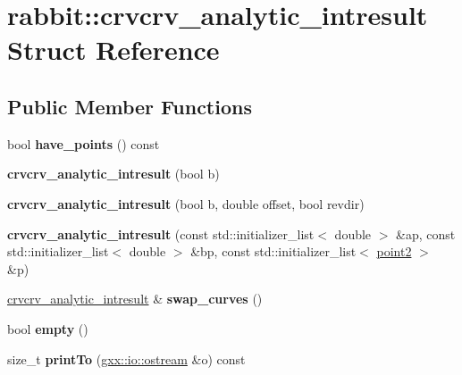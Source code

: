 \hypertarget{structrabbit_1_1crvcrv__analytic__intresult}{}\section{rabbit\+:\+:crvcrv\+\_\+analytic\+\_\+intresult Struct Reference}
\label{structrabbit_1_1crvcrv__analytic__intresult}
\subsection*{Public Member Functions}
\begin{DoxyCompactItemize}
\item 
bool {\bfseries have\+\_\+points} () const \hypertarget{structrabbit_1_1crvcrv__analytic__intresult_aac53ba39966aea9b14e45f54a23a150a}{}\label{structrabbit_1_1crvcrv__analytic__intresult_aac53ba39966aea9b14e45f54a23a150a}

\item 
{\bfseries crvcrv\+\_\+analytic\+\_\+intresult} (bool b)\hypertarget{structrabbit_1_1crvcrv__analytic__intresult_aaf8e0f2e035adb449e974ced8bdb1839}{}\label{structrabbit_1_1crvcrv__analytic__intresult_aaf8e0f2e035adb449e974ced8bdb1839}

\item 
{\bfseries crvcrv\+\_\+analytic\+\_\+intresult} (bool b, double offset, bool revdir)\hypertarget{structrabbit_1_1crvcrv__analytic__intresult_a2163f242cbae53dce317a41e89096fd1}{}\label{structrabbit_1_1crvcrv__analytic__intresult_a2163f242cbae53dce317a41e89096fd1}

\item 
{\bfseries crvcrv\+\_\+analytic\+\_\+intresult} (const std\+::initializer\+\_\+list$<$ double $>$ \&ap, const std\+::initializer\+\_\+list$<$ double $>$ \&bp, const std\+::initializer\+\_\+list$<$ \hyperlink{classmalgo_1_1vector2}{point2} $>$ \&p)\hypertarget{structrabbit_1_1crvcrv__analytic__intresult_a0dd00361b8cb546744907121a222337f}{}\label{structrabbit_1_1crvcrv__analytic__intresult_a0dd00361b8cb546744907121a222337f}

\item 
\hyperlink{structrabbit_1_1crvcrv__analytic__intresult}{crvcrv\+\_\+analytic\+\_\+intresult} \& {\bfseries swap\+\_\+curves} ()\hypertarget{structrabbit_1_1crvcrv__analytic__intresult_a8c50f3a1948ca5e1866aa016d454108f}{}\label{structrabbit_1_1crvcrv__analytic__intresult_a8c50f3a1948ca5e1866aa016d454108f}

\item 
bool {\bfseries empty} ()\hypertarget{structrabbit_1_1crvcrv__analytic__intresult_a0dc8e84861c424657203d47404337153}{}\label{structrabbit_1_1crvcrv__analytic__intresult_a0dc8e84861c424657203d47404337153}

\item 
size\+\_\+t {\bfseries print\+To} (\hyperlink{classgxx_1_1io_1_1ostream}{gxx\+::io\+::ostream} \&o) const \hypertarget{structrabbit_1_1crvcrv__analytic__intresult_a09daed1c771ee268480087e428e82948}{}\label{structrabbit_1_1crvcrv__analytic__intresult_a09daed1c771ee268480087e428e82948}

\end{DoxyCompactItemize}
